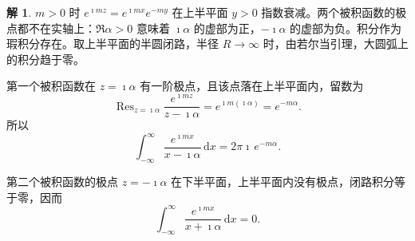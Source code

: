 \documentclass[11pt]{article}
\newcommand{\Res}{\operatorname{Res}}
\theoremstyle{remark}
\theoremstyle{definition}
\newtheorem{solution}{解}
\begin{document}
\begin{solution}
$m>0$ 时 $e^{\imath m z}=e^{\imath m x}e^{-my}$ 在上半平面 $y>0$ 指数衰减。两个被积函数的极点都不在实轴上：$\Re\alpha>0$ 意味着 $\imath\alpha$ 的虚部为正，$-\imath\alpha$ 的虚部为负。积分作为瑕积分存在。取上半平面的半圆闭路，半径 $R\to\infty$ 时，由若尔当引理，大圆弧上的积分趋于零。

第一个被积函数在 $z=\imath\alpha$ 有一阶极点，且该点落在上半平面内，留数为
\[
\Res_{z=\imath\alpha}\frac{e^{\imath m z}}{z-\imath\alpha}
=e^{\imath m(\imath\alpha)}
=e^{-m\alpha}.
\]
所以
\[
\int_{-\infty}^{\infty}\frac{e^{\imath m x}}{x-\imath\alpha}\,\mathrm{d}x
=2\pi\imath\, e^{-m\alpha}.
\]

第二个被积函数的极点 $z=-\imath\alpha$ 在下半平面，上半平面内没有极点，闭路积分等于零，因而
\[
\int_{-\infty}^{\infty}\frac{e^{\imath m x}}{x+\imath\alpha}\,\mathrm{d}x
=0.
\]
\end{solution}
\end{document}
